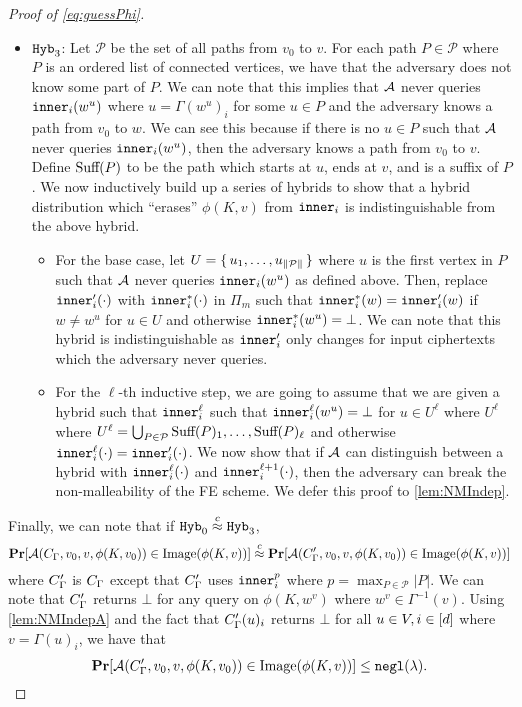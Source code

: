 \begin{proof}[Proof of \cref{eq:guessPhi}]
\begin{itemize}
		\item $\texttt{Hyb}_3$: Let $\mathcal{P}$ be the set of all paths from $v_0$ to $v$. For each path $P \in \mathcal{P}$
		where $P$ is an ordered list of connected vertices, we have that the adversary does not know
		some part of $P$. We can note that this implies that $\mathcal{A}$ never queries
		$\texttt{inner}_i(w^u)$ where $u = \Gamma(w^u)_i$ for some $u \in P$ and the adversary knows a path from $v_0$ to $w$.
		We can see this because if there is no $u \in P$ such that $\mathcal{A}$ never queries $\texttt{inner}_i(w^u)$,
		then the adversary knows a path from $v_0$ to $v$. Define $\text{Suff}(P)$ to be the path 
		which starts at $u$, ends at $v$, and is a suffix of $P$.
		We now inductively build up a series of hybrids to show that a hybrid distribution
		which ``erases'' $\phi(K, v)$ from $\texttt{inner}_i$ is indistinguishable from the above hybrid.
		\begin{itemize}
			\item For the base case, let $U = \set{u_1, \dots, u_{\|\mathcal{P}\|} }$
			where $u$ is the first vertex in $P$ such that $\mathcal{A}$ never queries $\texttt{inner}_i(w^u)$ as defined above.
			Then, replace $\texttt{inner}_i'(\cdot)$ with $\texttt{inner}_i^*(\cdot)$ in $\Pi_m$ such that $\texttt{inner}_i^*(w) = \texttt{inner}_i'(w)$
			if $w \neq w^u$ for $u \in U$ and otherwise $\texttt{inner}_i^*(w^u) = \bot$. We can note that this hybrid is indistinguishable as
			$\texttt{inner}_i'$ only changes for input ciphertexts which the adversary never queries.
			\item For the $\ell$-th inductive step, we are going to assume that we are given a hybrid such that $\texttt{inner}_i^\ell$ such that $\texttt{inner}_i^\ell(w^u) = \bot$
			for $u \in U^\ell$ where $U^\ell$ where $U^\ell = \bigcup_{P \in \mathcal{P}} \text{Suff}(P)_1, \dots, \text{Suff}(P)_\ell$
			and otherwise $\texttt{inner}_i^\ell(\cdot) = \texttt{inner}_i'(\cdot)$. We now show that if $\mathcal{A}$ can distinguish
			between a hybrid with $\texttt{inner}_i^\ell(\cdot)$ and $\texttt{inner}_i^{\ell + 1}(\cdot)$, then the adversary can break
			the non-malleability of the FE scheme.
			We defer this proof to \cref{lem:NMIndep}.
		\end{itemize}
	\end{itemize}
	Finally, we can note that if $\texttt{Hyb}_0 \overset{c}{\approx} \texttt{Hyb}_3$,
	\begin{equation*}
		\operatorname*{\mathbf{Pr}}[\mathcal{A}(C_\Gamma, v_0, v, \phi(K, v_0)) \in \text{Image}(\phi(K, v))] 
		\overset{c}{\approx}
		\operatorname*{\mathbf{Pr}}[\mathcal{A}(C_\Gamma', v_0, v, \phi(K, v_0)) \in \text{Image}(\phi(K, v))] 
	\end{equation*}
	where $C_\Gamma'$ is $C_\Gamma$ except that $C_\Gamma'$ uses $\texttt{inner}_i^p$ where $p = \max_{P \in \mathcal{P}} |P|$.
	We can note that $C_\Gamma'$ returns $\bot$ for any query on $\phi(K, w^v)$ where $w^v \in \Gamma^{-1}(v)$.
	Using \cref{lem:NMIndepA} and the fact that $C_\Gamma'(u)_i$ returns $\bot$ for all $u \in V, i \in [d]$ where $v = \Gamma(u)_i$, we have that
	$$
		\operatorname*{\mathbf{Pr}}[\mathcal{A}(C_\Gamma', v_0, v, \phi(K, v_0)) \in \text{Image}(\phi(K, v))] \leq \texttt{negl}(\lambda).
	$$
	

\end{proof}
